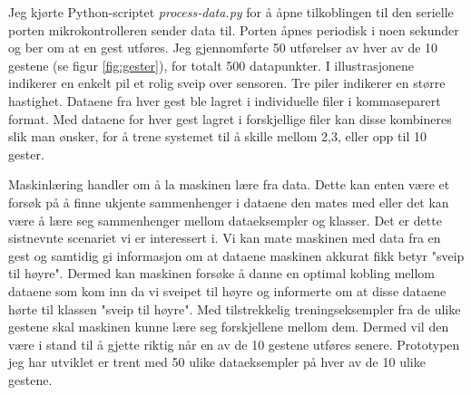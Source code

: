 Jeg kjørte Python-scriptet \emph{process-data.py} for å åpne tilkoblingen til den serielle porten mikrokontrolleren sender data til. Porten åpnes periodisk i noen sekunder og ber om at en gest utføres. Jeg gjennomførte 50 utførelser av hver av de 10 gestene (se figur \ref{fig:gester}), for totalt 500 datapunkter. I illustrasjonene indikerer en enkelt pil et rolig sveip over sensoren. Tre piler indikerer en større hastighet. Dataene fra hver gest ble lagret i individuelle filer i kommaseparert format. Med dataene for hver gest lagret i forskjellige filer kan disse kombineres slik man ønsker, for å trene systemet til å skille mellom 2,3, eller opp til 10 gester. 

Maskinlæring handler om å la maskinen lære fra data. Dette kan enten være et forsøk på å finne ukjente sammenhenger i dataene den mates med eller det kan være å lære seg sammenhenger mellom dataeksempler og klasser. Det er dette sistnevnte scenariet vi er interessert i. Vi kan mate maskinen med data fra en gest og samtidig gi informasjon om at dataene maskinen akkurat fikk betyr "sveip til høyre". Dermed kan maskinen forsøke å danne en optimal kobling mellom dataene som kom inn da vi sveipet til høyre og informerte om at disse dataene hørte til klassen "sveip til høyre". Med tilstrekkelig treningseksempler fra de ulike gestene skal maskinen kunne lære seg forskjellene mellom dem. Dermed vil den være i stand til å gjette riktig når en av de 10 gestene utføres senere. Prototypen jeg har utviklet er trent med 50 ulike dataeksempler på hver av de 10 ulike gestene.
